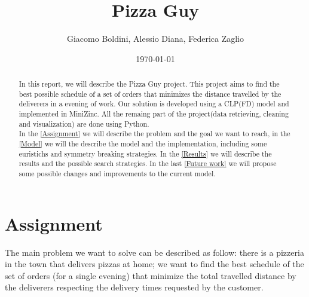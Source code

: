 \documentclass[10pt]{article}
\title{Pizza Guy}
\date{\today}
\author{Giacomo Boldini, Alessio Diana, Federica Zaglio}
\begin{document}
	\maketitle

	\begin{abstract}

		In this report, we will describe the Pizza Guy project. This project 
		aims to find the best possible schedule of a set of orders that
		minimizes the distance travelled by the deliverers in a evening of 
		work. Our solution is developed using a CLP(FD) model and implemented 
		in MiniZinc. All the remaing part of the project(data retrieving, cleaning
		and visualization) are done using Python.\\	
		In the \cref{Assignment} we will describe the problem and the goal
		we want to reach, in the \cref{Model} we will the describe the 
		model and the implementation, including some euristichs and symmetry breaking
		strategies. In the \cref{Results} we will describe the results and
		the possible search strategies. In the last \cref{Future work} we 
		will propose some possible changes and improvements to the current model.
		
	\end{abstract}

	\tableofcontents

	\pagebreak

	\section{Assignment}
	\label{Assignment}
	The main problem we want to solve can be described as follow: there is a pizzeria in the 
	town that delivers pizzas at home; we want to find the best schedule of the set of orders 
	(for a single evening) that minimize the total travelled distance by the deliverers 
	respecting the delivery times requested by the customer.
	
\end{document}
